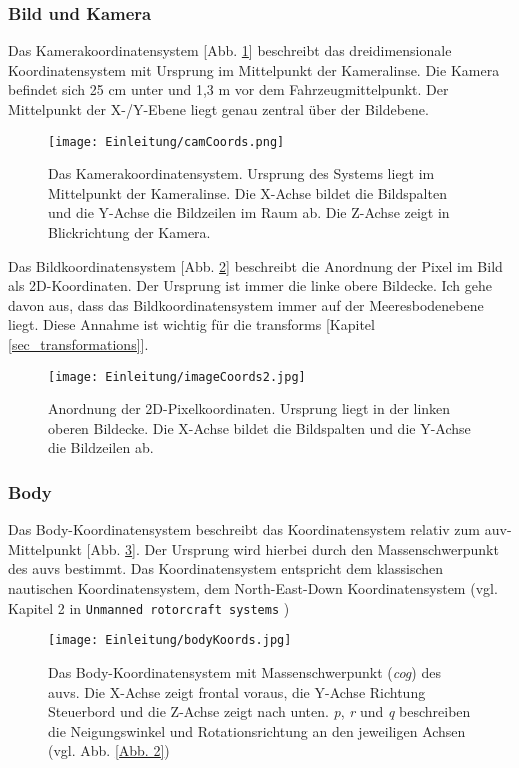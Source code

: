 \subsubsection{Bild und Kamera}
\label{sec_img_cam_coords}
Das Kamerakoordinatensystem [Abb. \ref{CamKoords}] beschreibt das dreidimensionale Koordinatensystem mit Ursprung im Mittelpunkt der Kameralinse. Die Kamera befindet sich 25 cm unter und 1,3 m vor dem Fahrzeugmittelpunkt. Der Mittelpunkt der X-/Y-Ebene liegt genau zentral über der Bildebene.
\begin{figure}[H]
	\centering
	\texttt{[image: Einleitung/camCoords.png]}
	\caption[Das Kamerakoordinatensystem]{Das Kamerakoordinatensystem. Ursprung des Systems liegt im Mittelpunkt der Kameralinse. Die X-Achse bildet die Bildspalten und die Y-Achse die Bildzeilen im Raum ab. Die Z-Achse zeigt in Blickrichtung der Kamera.}
	\label{CamKoords}
\end{figure}

Das Bildkoordinatensystem [Abb. \ref{imageKoords}] beschreibt die Anordnung der Pixel im Bild als 2D-Koordinaten. Der Ursprung ist immer die linke obere Bildecke. Ich gehe davon aus, dass das Bildkoordinatensystem immer auf der Meeresbodenebene liegt. Diese Annahme ist wichtig für die \glspl{transform} [Kapitel \ref{sec_transformations}].
\begin{figure}[H]
	\centering
	\texttt{[image: Einleitung/imageCoords2.jpg]}
	\caption[Das Bildkoordinatensystem]{Anordnung der 2D-Pixelkoordinaten. Ursprung liegt in der linken oberen Bildecke. Die X-Achse bildet die Bildspalten und die Y-Achse die Bildzeilen ab.}
	\label{imageKoords}
\end{figure}

\subsubsection{Body}
Das Body-Koordinatensystem beschreibt das Koordinatensystem relativ zum \gls{auv}-Mittelpunkt [Abb. \ref{Abb. 1}].
Der Ursprung wird hierbei durch den Massenschwerpunkt des \gls{auv}s bestimmt.
Das Koordinatensystem entspricht dem klassischen nautischen Koordinatensystem, dem North-East-Down Koordinatensystem (vgl. Kapitel 2 in \texttt{Unmanned rotorcraft systems} \cite{cai2011unmanned})
\begin{figure}[H]
	\centering
	\texttt{[image: Einleitung/bodyKoords.jpg]}
	\caption[Das Body-Koordinatensystem]{Das Body-Koordinatensystem mit Massenschwerpunkt (\textit{cog}) des \gls{auv}s. Die X-Achse zeigt frontal voraus, die Y-Achse Richtung Steuerbord und die Z-Achse zeigt nach unten. \textit{p}, \textit{r} und \textit{q} beschreiben die Neigungswinkel und Rotationsrichtung an den jeweiligen Achsen (vgl. Abb. \ref{Abb. 2})}
	\label{Abb. 1}
\end{figure}

